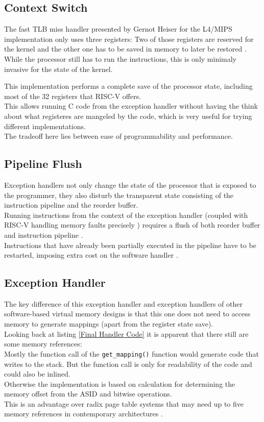 \subsection{Context Switch} The fast TLB miss handler presented by Gernot Heiser for the
L4/MIPS implementation only uses three registers: Two of those registers are reserved
for the kernel and the other one has to be saved in memory to later be restored \cite{heiserAnatomyHighPerformanceMicrokernel}.
\\While the processor still has to run the instructions, this is only minimaly invasive
for the state of the kernel.

This implementation performs a complete save of the processor state, including most of the
32 registers that RISC-V offers.\\
This allows running C code from the exception handler without having the think about what
registeres are mangeled by the code, which is very useful for trying different implementations.\\
The tradeoff here lies between ease of programmability and performance.

\subsection{Pipeline Flush} Exception handlers not only change the state of the processor that is
exposed to the programmer, they also disturb the transparent state consisting of the
instruction pipeline and the reorder buffer.\\
Running instructions from the context of the exception handler (coupled with RISC-V handling
memory faults precisely \cite{RISCVInstructionSet}) requires a flush of both reorder buffer
and instruction pipeline \cite{jacobVirtualMemoryContemporary1998}.\\
Instructions that have already been partially executed in the pipeline have to be restarted,
imposing extra cost on the software handler \cite{jacob1998look}.

\subsection{Exception Handler} The key difference of this exception handler and exception handlers
of other software-based virtual memory designs is that this one does not need to access
memory to generate mappings (apart from the register state save).\\
Looking back at listing \ref{Final Handler Code} it is apparent that there still are some
memory references:\\
Mostly the function call of the \texttt{get\_mapping()} function would generate code that
writes to the stack. But the function call is only for readability of the code and could also
be inlined.\\
Otherwise the implementation is based on calculation for determining the memory offset from
the ASID and bitwise operations.\\
This is an advantage over radix page table systems that may need up to five memory references
in contemporary architectures \cite{intel5LevelPaging5Level2017}.

